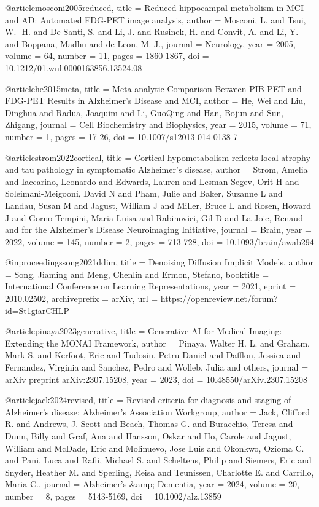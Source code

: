 @article{mosconi2005reduced,
  title = {Reduced hippocampal metabolism in MCI and AD: Automated FDG-PET image analysis},
  author = {Mosconi, L. and Tsui, W. -H. and De Santi, S. and Li, J. and Rusinek, H. and Convit, A. and Li, Y. and Boppana, Madhu and de Leon, M. J.},
  journal = {Neurology},
  year = {2005},
  volume = {64},
  number = {11},
  pages = {1860-1867},
  doi = {10.1212/01.wnl.0000163856.13524.08}
}

@article{he2015meta,
  title = {Meta-analytic Comparison Between PIB-PET and FDG-PET Results in Alzheimer’s Disease and MCI},
  author = {He, Wei and Liu, Dinghua and Radua, Joaquim and Li, GuoQing and Han, Bojun and Sun, Zhigang},
  journal = {Cell Biochemistry and Biophysics},
  year = {2015},
  volume = {71},
  number = {1},
  pages = {17-26},
  doi = {10.1007/s12013-014-0138-7}
}

@article{strom2022cortical,
  title = {Cortical hypometabolism reflects local atrophy and tau pathology in symptomatic Alzheimer’s disease},
  author = {Strom, Amelia and Iaccarino, Leonardo and Edwards, Lauren and Lesman-Segev, Orit H and Soleimani-Meigooni, David N and Pham, Julie and Baker, Suzanne L and Landau, Susan M and Jagust, William J and Miller, Bruce L and Rosen, Howard J and Gorno-Tempini, Maria Luisa and Rabinovici, Gil D and La Joie, Renaud and {for the Alzheimer’s Disease Neuroimaging Initiative}},
  journal = {Brain},
  year = {2022},
  volume = {145},
  number = {2},
  pages = {713-728},
  doi = {10.1093/brain/awab294}
}

@inproceedings{song2021ddim,
 title = {Denoising Diffusion Implicit Models},
 author = {Song, Jiaming and Meng, Chenlin and Ermon, Stefano},
 booktitle = {International Conference on Learning Representations},
 year = {2021},
 eprint = {2010.02502},
 archiveprefix = {arXiv},
 url = {https://openreview.net/forum?id=St1giarCHLP}
}

@article{pinaya2023generative,
 title = {Generative AI for Medical Imaging: Extending the MONAI Framework},
 author = {Pinaya, Walter H. L. and Graham, Mark S. and Kerfoot, Eric and Tudosiu, Petru-Daniel and Dafflon, Jessica and Fernandez, Virginia and Sanchez, Pedro and Wolleb, Julia and others},
 journal = {arXiv preprint arXiv:2307.15208},
 year = {2023},
 doi = {10.48550/arXiv.2307.15208}
}

@article{jack2024revised,
  title = {Revised criteria for diagnosis and staging of Alzheimer's disease: Alzheimer's Association Workgroup},
  author = {Jack, Clifford R. and Andrews, J. Scott and Beach, Thomas G. and Buracchio, Teresa and Dunn, Billy and Graf, Ana and Hansson, Oskar and Ho, Carole and Jagust, William and McDade, Eric and Molinuevo, Jose Luis and Okonkwo, Ozioma C. and Pani, Luca and Rafii, Michael S. and Scheltens, Philip and Siemers, Eric and Snyder, Heather M. and Sperling, Reisa and Teunissen, Charlotte E. and Carrillo, Maria C.},
  journal = {Alzheimer's \&amp; Dementia},
  year = {2024},
  volume = {20},
  number = {8},
  pages = {5143-5169},
  doi = {10.1002/alz.13859}
}


